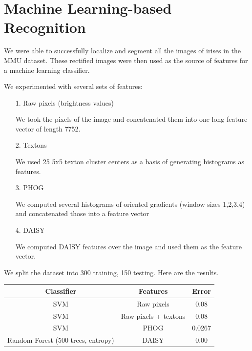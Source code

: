 \documentclass[12pt]{article}
\begin{document}
\section{Machine Learning-based Recognition}
\label{sec:recog}
We were able to successfully localize and segment all the images of irises in the MMU dataset. These rectified images were then used as the source of features for a machine learning classifier.

We experimented with several sets of features:
\begin{itemize}
\item[1.] Raw pixels (brightness values)

We took the pixels of the image and concatenated them into one long feature vector of length 7752.
\item[2.] Textons \cite{malik}

We used 25 5x5 texton cluster centers as a basis of generating histograms as features.

\item[3.] PHOG

We computed several histograms of oriented gradients (window sizes 1,2,3,4) and concatenated those into a feature vector

\item[4.] DAISY \cite{daisy}

We computed DAISY features over the image and used them as the feature vector.

\end{itemize}

We split the dataset into 300 training, 150 testing. Here are the results.

\begin{tabular}{| c | c | c |}
\hline
Classifier & Features & Error \\ \hline
SVM & Raw pixels & 0.08 \\ \hline
SVM & Raw pixels + textons & 0.08 \\ \hline
SVM & PHOG & 0.0267 \\ \hline
Random Forest (500 trees, entropy) & DAISY & 0.00 \\ \hline
\end{tabular}
\end{document}
